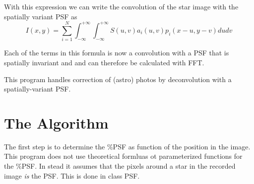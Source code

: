 With this expression we can write the convolution of the star image with the spatially variant PSF as \[ I (x,y) = \sum _{i = 1} ^ N \int _{-\infty} ^ {+\infty} \int _{-\infty} ^ {+\infty} S(u, v) a_i (u, v) p_i (x -u, y - v)du dv \]

Each of the terms in this formula is now a convolution with a PSF that is spatially invariant and and can therefore be calculated with FFT.

This program handles correction of (astro) photos by deconvolution with a spatially-\/variant PSF.\section{The Algorithm}\label{index_algorithm}
The first step is to determine the \%PSF as function of the position in the image. This program does not use theoretical formluas ot parameterized functions for the \%PSF. In stead it assumes that the pixels around a star in the recorded image {\itshape is\/} the PSF. This is done in class PSF. 